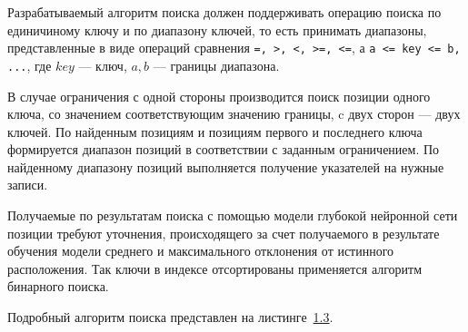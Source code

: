 
Разрабатываемый алгоритм поиска должен поддерживать операцию поиска по
единичиному ключу и по диапазону ключей, то есть принимать диапазоны,
представленные в виде операций сравнения \texttt{=, >, <, >=, <=}, а \texttt{a
<= key <= b, ...}, где $key$ --- ключ, $a, b$ --- границы диапазона.

В случае ограничения с одной стороны производится поиск позиции одного ключа, со
значением соответствующим значению границы, c двух сторон --- двух ключей.  По
найденным позициям и позициям первого и последнего ключа формируется диапазон
позиций в соответствии с заданным ограничением. По найденному диапазону позиций
выполняется получение указателей на нужные записи.

Получаемые по результатам поиска с помощью модели глубокой нейронной сети
позиции требуют уточнения, происходящего за счет получаемого в результате
обучения модели среднего и максимального отклонения от истинного расположения.
Так ключи в индексе отсортированы применяется алгоритм бинарного поиска.

Подробный алгоритм поиска представлен на листинге~\hyperref[alg:search]{1.3}.
\vspace{0.5cm}

